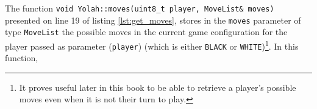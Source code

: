 \documentclass[12pt,a4paper,twoside,openright]{book}
\begin{document}
The function \texttt{void Yolah::moves(uint8_t player, MoveList& moves)} presented on line 19 of listing \ref{lst:get_moves}, stores in the \texttt{moves} parameter of type \texttt{MoveList} the possible moves in the current game configuration for the player passed as parameter (\texttt{player}) (which is either \texttt{BLACK} or \texttt{WHITE})\footnote{It proves useful later in this book to be able to retrieve a player's possible moves even when it is not their turn to play.}. In this function,
\end{document}
